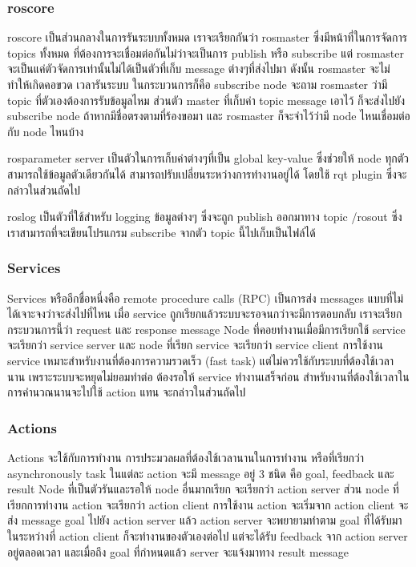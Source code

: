 \subsubsection*{roscore}
roscore เป็นส่วนกลางในการรันระบบทั้งหมด เราจะเรียกกันว่า rosmaster ซึ่งมีหน้าที่ในการจัดการ
topics ทั้งหมด ที่ต้องการจะเชื่อมต่อกันไม่ว่าจะเป็นการ publish หรือ subscribe แต่ rosmaster
จะเป็นแค่ตัวจัดการเท่านั้นไม่ได้เป็นตัวที่เก็บ message ต่างๆที่ส่งไปมา ดังนั้น rosmaster จะไม่ทำให้เกิดคอขวด เวลารันระบบ
ในกระบวนการก็คือ subscribe node จะถาม rosmaster ว่ามี topic ที่ตัวเองต้องการรับข้อมูลไหม
ส่วนตัว master ที่เก็บค่า topic message เอาไว้ ก็จะส่งไปยัง subscribe node ถ้าหากมีชื่อตรงตามที่ร้องขอมา
และ rosmaster ก็จะจำไว้ว่ามี node ไหนเชื่อมต่อกับ node ไหนบ้าง

rosparameter server เป็นตัวในการเก็บค่าต่างๆที่เป็น global key-value ซึ่งช่วยให้ node ทุกตัวสามารถใช้ข้อมูลตัวเดียวกันได้
สามารถปรับเปลี่ยนระหว่างการทำงานอยู่ได้ โดยใช้ rqt plugin ซึ่งจะกล่าวในส่วนถัดไป

roslog เป็นตัวที่ใช้สำหรับ logging ข้อมูลต่างๆ ซึ่งจะถูก publish ออกมาทาง topic /rosout ซึ่งเราสามารถที่จะเขียนโปรแกรม
subscribe จากตัว topic นี้ไปเก็บเป็นไฟล์ได้

\subsubsection*{Services}
Services หรืออีกชื่อหนึ่งคือ remote procedure calls (RPC) เป็นการส่ง messages แบบที่ไม่ได้เจาะจงว่าจะส่งไปที่ไหน
เมื่อ service ถูกเรียกแล้วระบบจะรอจนกว่าจะมีการตอบกลับ เราจะเรียกกระบวนการนี้ว่า request และ response message
Node ที่คอยทำงานเมื่อมีการเรียกใช้ service จะเรียกว่า service server และ node ที่เรียก service จะเรียกว่า service client
การใช้งาน service เหมาะสำหรับงานที่ต้องการความรวดเร็ว (fast task) แต่ไม่ควรใช้กับระบบที่ต้องใช้เวลานาน
เพราะระบบจะหยุดไม่ยอมทำต่อ ต้องรอให้ service ทำงานเสร็จก่อน สำหรับงานที่ต้องใช้เวลาในการคำนวณนานจะไปใช้ action
แทน จะกล่าวในส่วนถัดไป 

\subsubsection*{Actions}
Actions จะใช้กับการทำงาน การประมวลผลที่ต้องใช้เวลานานในการทำงาน หรือที่เรียกว่า asynchronously task
ในแต่ละ action จะมี message อยู่ 3 ชนิด คือ goal, feedback และ result Node ที่เป็นตัวรันและรอให้ node อื่นมากเรียก
จะเรียกว่า action server ส่วน node ที่เรียกการทำงาน action จะเรียกว่า action client การใช้งาน action จะเริ่มจาก
action client จะส่ง message goal ไปยัง action server แล้ว action server จะพยายามทำตาม goal ที่ได้รับมา ในระหว่างที่
action client ก็จะทำงานของตัวเองต่อไป แต่จะได้รับ feedback จาก action server อยู่ตลอดเวลา และเมื่อถึง goal ที่กำหนดแล้ว
server จะแจ้งมาทาง result message

